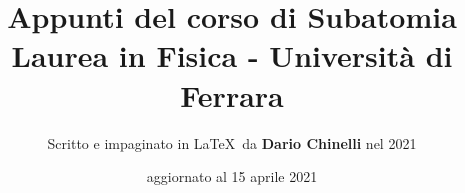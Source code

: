 \documentclass[11pt]{article}
\begin{document}
\title{\textbf{Appunti del corso di Subatomia} \\
Laurea in Fisica - Università di Ferrara} 

\author{Scritto e impaginato in \LaTeX\ da \textbf{Dario Chinelli} nel 2021}

\date{aggiornato al 15 aprile 2021}

\maketitle

\newpage

\tableofcontents

\newpage
% 




\end{document}
